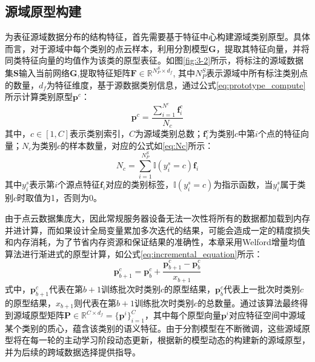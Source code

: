 \subsection{源域原型构建}
为表征源域数据分布的结构特征，首先需要基于特征中心构建源域类别原型。具体而言，对于源域中每个类别的点云样本，利用分割模型$\mathbf{G}$，提取其特征向量，并将同类特征向量的均值作为该类的原型表征。如图\ref{fig:3-2}所示，将标注的源域数据集$\mathbf{S}$输入当前网络$\mathbf{G}$,提取特征矩阵$\mathbf{F} \in \mathbb{R}^{{N^S_P} \times d_f}$, 其中\(N^S_P\)表示源域中所有标注类别点的数量，$d_f$为特征维度，基于源数据类别信息，通过公式\eqref{eq:prototype_compute}所示计算类别原型\( \mathbf{p}^c \)：
\begin{equation}
    \label{eq:prototype_compute}
    \mathbf{p}^c = \frac{\sum_{i=1}^{N^c} \mathbf{f}_i^c}{N_c}
\end{equation}
其中，\( c \in [1, C] \)表示类别索引，\( C \)为源域类别总数；\( \mathbf{f}_i^c \)为类别\( c \)中第\( i \)个点的特征向量；\( N_c \)为类别\( c \)的样本数量，对应的公式如\eqref{eq:Nc}所示：
\begin{equation}
    \label{eq:Nc}
    N_c = \sum^{N^S_P}_{i=1} \mathbb{I}(y^s_i = c)\mathbf{f}_i
\end{equation}
其中\( y^s_i \)表示第\(i\)个源点特征\( \mathbf{f}_i \)对应的类别标签，$\mathbb{I}(y^s_i = c)$为指示函数，当$y^s_i$属于类别$c$时取值为1，否则为0。

由于点云数据集庞大，因此常规服务器设备无法一次性将所有的数据都加载到内存并进计算，而如果设计全局变量累加多次迭代的结果，可能会造成一定的精度损失和内存消耗，为了节省内存资源和保证结果的准确性，本章采用Welford增量均值算法进行渐进式的原型计算，如公式\eqref{eq:incremental_equation}所示：
\begin{equation}
\label{eq:incremental_equation}
    \mathbf{p}_{b+1}^c = \mathbf{p}_b^c + \frac{\mathbf{p}_{b+1}^c - \mathbf{p}_b^c}{x_{b+1}}
\end{equation}
式中，\(\mathbf{p}_{b+1}^c\)代表在第\(b+1\)训练批次时类别\(c\)的原型结果，\(\mathbf{p}_{b}^c\)代表上一批次时类别\(c\)的原型结果，\( x_{b+1} \)则代表在第\( b+1 \)训练批次时类别\( c \)的总数量。通过该算法最终得到源域原型矩阵\( \mathbf{P} \in \mathbb{R}^{C \times {d_f}} = \{\mathbf{p}^i\}^C_{i=1} \)，其中每个原型向量\(\mathbf{p}^i\)对应特征空间中源域某个类别的质心，蕴含该类别的语义特征。由于分割模型在不断微调，这些源域原型将在每一轮的主动学习阶段动态更新，根据新的模型动态的构建新的源域原型，并为后续的跨域数据选择提供指导。

